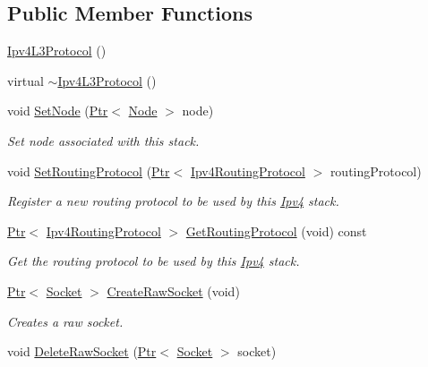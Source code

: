\subsection*{Public Member Functions}
\begin{DoxyCompactItemize}
\item 
\hyperlink{classns3_1_1Ipv4L3Protocol_a994880814b636138a70977fa8fb51047}{Ipv4\+L3\+Protocol} ()
\item 
virtual \hyperlink{classns3_1_1Ipv4L3Protocol_a6396c85e2562a15ba495efcf32a63786}{$\sim$\+Ipv4\+L3\+Protocol} ()
\item 
void \hyperlink{classns3_1_1Ipv4L3Protocol_a82ef37914ea8bab699575fea23586bc7}{Set\+Node} (\hyperlink{classns3_1_1Ptr}{Ptr}$<$ \hyperlink{classns3_1_1Node}{Node} $>$ node)
\begin{DoxyCompactList}\small\item\em Set node associated with this stack. \end{DoxyCompactList}\item 
void \hyperlink{classns3_1_1Ipv4L3Protocol_a7e7d286dc2c782ea931d12a95203fc29}{Set\+Routing\+Protocol} (\hyperlink{classns3_1_1Ptr}{Ptr}$<$ \hyperlink{classns3_1_1Ipv4RoutingProtocol}{Ipv4\+Routing\+Protocol} $>$ routing\+Protocol)
\begin{DoxyCompactList}\small\item\em Register a new routing protocol to be used by this \hyperlink{classns3_1_1Ipv4}{Ipv4} stack. \end{DoxyCompactList}\item 
\hyperlink{classns3_1_1Ptr}{Ptr}$<$ \hyperlink{classns3_1_1Ipv4RoutingProtocol}{Ipv4\+Routing\+Protocol} $>$ \hyperlink{classns3_1_1Ipv4L3Protocol_aa1e4efbf4978299e47406895c3f4b41d}{Get\+Routing\+Protocol} (void) const 
\begin{DoxyCompactList}\small\item\em Get the routing protocol to be used by this \hyperlink{classns3_1_1Ipv4}{Ipv4} stack. \end{DoxyCompactList}\item 
\hyperlink{classns3_1_1Ptr}{Ptr}$<$ \hyperlink{classns3_1_1Socket}{Socket} $>$ \hyperlink{classns3_1_1Ipv4L3Protocol_abc060605c64f9dc7c56f5d8124fbaec2}{Create\+Raw\+Socket} (void)
\begin{DoxyCompactList}\small\item\em Creates a raw socket. \end{DoxyCompactList}\item 
void \hyperlink{classns3_1_1Ipv4L3Protocol_a170d2d386421ff92c45c2e7dd3f79a5e}{Delete\+Raw\+Socket} (\hyperlink{classns3_1_1Ptr}{Ptr}$<$ \hyperlink{classns3_1_1Socket}{Socket} $>$ socket)

\end{DoxyCompactItemize}
